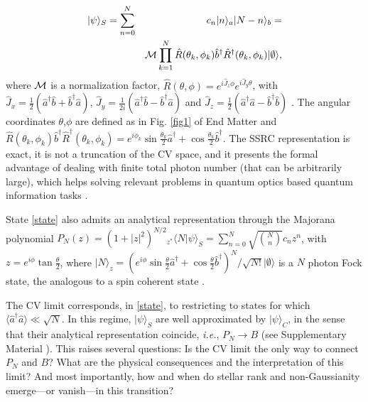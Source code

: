 \documentclass[aps,prl,showpacs,twocolumn]{revtex4-2}
\providecommand{\ket}[1]{\lvert #1 \rangle}
\providecommand{\ket}[1]{\lvert #1 \rangle}
\providecommand{\ket}[1]{\lvert #1 \rangle}
\providecommand{\ket}[1]{\lvert #1 \rangle}
\begin{document}
\begin{eqnarray}\label{state}
&\ket{\psi}_S=\sum_{n=0}^N& c_n\ket{n}_a\ket{N-n}_b= \\
&&{\cal M}\prod_{k=1}^N \hat R(\theta_k,\phi_k)\hat b^{\dagger}\hat R^{\dagger}(\theta_k,\phi_k)\ket{\emptyset}\nonumber,
\end{eqnarray}
where ${\cal M}$ is a normalization factor, $\hat R(\theta,\phi)=e^{i\hat J_z \phi}e^{i\hat J_y \theta}$, with $\hat J_x=\frac{1}{2}(\hat a^{\dagger}\hat b +\hat b^{\dagger}\hat a)$, $\hat J_y=\frac{1}{2i}(\hat a^{\dagger}\hat b -\hat b^{\dagger}\hat a)$ and $\hat J_z=\frac{1}{2}(\hat a^{\dagger}\hat a -\hat b^{\dagger}\hat b)$ \cite{Schwinger}. The angular coordinates $\theta$,$\phi$ are defined as in Fig. \ref{fig1} of End Matter and $\hat R(\theta_k,\phi_k)\hat b^{\dagger}\hat R^{\dagger}(\theta_k,\phi_k)=e^{i\phi_k}\sin{\frac{\theta_k}{2}}\hat a^{\dagger}+\cos{\frac{\theta_k}{2}}\hat b^{\dagger}$. The SSRC representation is exact, it is not a truncation of the CV space, and it presents the formal advantage of dealing with finite total photon number (that can be arbitrarily large), which helps solving relevant problems in quantum optics based quantum information tasks \cite{descamps2024superselectionrules, descamps2025HW, saharyan2025, descamps2025unifiedframeworkbosonicquantum}.

State \eqref{state} also admits an analytical representation \cite{AVourdas_2004, vourdas_2006} through the Majorana polynomial \cite{Majorana1932AtomiOI} $P_N\left (z\right )=\left (1+|z|^2\right )^{N/2}{}_{z^*}\langle N |\psi\rangle_S=\sum_{n=0}^N \sqrt{\binom{N}{n}}c_n z^n$, with $z=e^{i\phi}\tan{\frac{\theta}{2}}$, where $\ket{N}_z=(e^{i\phi}\sin{\frac{\theta}{2}}\hat a^{\dagger}+\cos{\frac{\theta}{2}}\hat b^{\dagger} )^N/\sqrt{N!}\ket{\emptyset}$ is a $N$ photon Fock state, the analogous to a spin coherent state \cite{Chryssomalakos_2018, RHoltz_1974}.

The CV limit corresponds, in \eqref{state}, to restricting to states for which $\langle \hat a^{\dagger}\hat a\rangle \ll \sqrt{N}$. In this regime, $\ket{\psi}_S$ are well approximated by $\ket{\psi}_C$, in the sense that their analytical representation coincide, {\it i.e.}, $P_N\to B$ (see Supplementary Material \cite{SM}). This raises several questions: Is the CV limit the only way to connect $P_N$ and $B$? What are the physical consequences and the interpretation of this limit? And most importantly, how and when do stellar rank and non-Gaussianity emerge—or vanish—in this transition?
\end{document}
